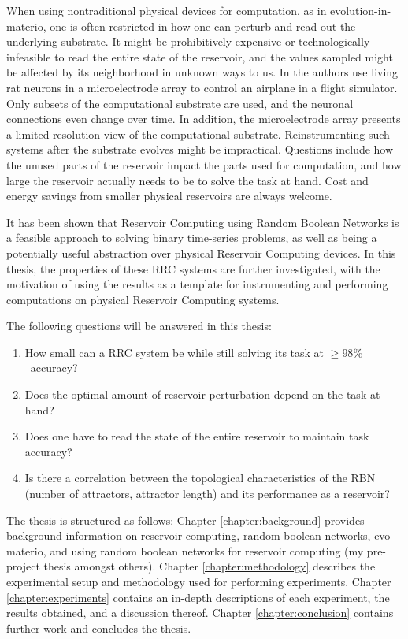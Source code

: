 When using nontraditional physical devices for computation, as in evolution-in-materio,
one is often restricted in how one can perturb and read out the underlying substrate.
It might be prohibitively expensive or technologically infeasible to read the entire state of the reservoir,
and the values sampled might be affected by its neighborhood in unknown ways to us.
In \cite{demarse2005adaptive} the authors use living rat neurons in a microelectrode array to control an airplane in a flight simulator.
Only subsets of the computational substrate are used,
and the neuronal connections even change over time.
In addition, the microelectrode array presents a limited resolution view of the computational substrate.
Reinstrumenting such systems after the substrate evolves might be impractical.
Questions include how the unused parts of the reservoir impact the parts used for computation,
and how large the reservoir actually needs to be to solve the task at hand.
Cost and energy savings from smaller physical reservoirs are always welcome.

It has been shown that Reservoir Computing using Random Boolean Networks is a feasible approach to solving binary time-series problems,
as well as being a potentially useful abstraction over physical Reservoir Computing devices.
In this thesis, the properties of these RRC systems are further investigated,
with the motivation of using the results as a template for instrumenting and performing computations on physical Reservoir Computing systems.

The following questions will be answered in this thesis:
\begin{enumerate}
    \item How small can a RRC system be while still solving its task at $ \geq 98\% $ accuracy?
    \item Does the optimal amount of reservoir perturbation depend on the task at hand?
    \item Does one have to read the state of the entire reservoir to maintain task accuracy?
    \item Is there a correlation between the topological characteristics of the RBN (number of attractors, attractor length) and its performance as a reservoir?
\end{enumerate}

The thesis is structured as follows:
Chapter \ref{chapter:background} provides background information on reservoir computing, random boolean networks, evo-materio, and using random boolean networks for reservoir computing (my pre-project thesis amongst others).
Chapter \ref{chapter:methodology} describes the experimental setup and methodology used for performing experiments.
Chapter \ref{chapter:experiments} contains an in-depth descriptions of each experiment,
the results obtained, and a discussion thereof.
Chapter \ref{chapter:conclusion} contains further work and concludes the thesis.

\cleardoublepage

